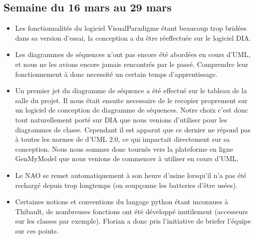   \subsection{Semaine du 16 mars au 29 mars}
  \label{sub:Semaine du 16 mars au 29 mars}
    \begin{itemize}
      \item Les fonctionnalités du logiciel VisualParadigme étant beaucoup trop bridées dans sa version d'essai, la conception a du être réeffectuée sur le logiciel DIA.
      \item Les diagrammes de séquences n'ont pas encore été abordées en cours d'UML, et nous ne les avions encore jamais rencontrés par le passé.
      Comprendre leur fonctionnement à donc necessité un certain temps d'apprentissage.
      \item Un premier jet du diagramme de séquence a été effectué sur le tableau de la salle du projet.
      Il nous était ensuite necessaire de le recopier proprement sur un logiciel de conception de diagramme de séquences.
      Notre choix c'est donc tout naturellement porté sur DIA que nous venions d'utiliser pour les diagrammes de classe.
      Cependant il est apparut que ce dernier ne répond pas à toutes les normes de d'UML 2.0, ce qui impactait directement sur sa conception.
      Nous nous sommes donc tournés vers la plateforme en ligne GenMyModel que nous venions de commencer à utiliser en cours d'UML.
      \item Le NAO se remet automatiquement à son heure d’usine lorsqu’il n’a pas été rechargé depuis trop longtemps (on soupçonne les batteries d’être usées).
      \item Certaines notions et conventions du langage python étant inconnues à Thibault, de nombreuses fonctions ont été développé inutilement (accesseurs sur les classes par exemple).
      Florian a donc pris l’initiative de briefer l’équipe sur ces points.\\
    \end{itemize}



